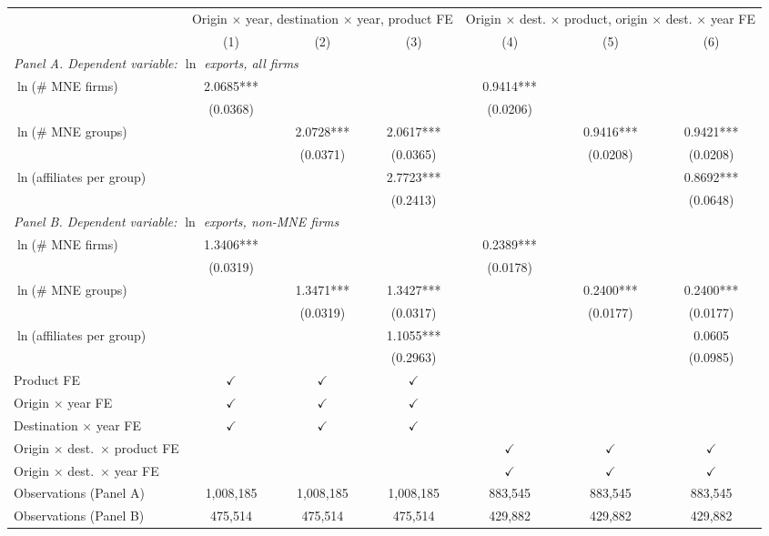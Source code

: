 \begin{tabular}{lcccccc} \hline
 & \multicolumn{3}{c}{Origin $\times$ year, destination $\times$ year, product FE} & \multicolumn{3}{c}{Origin $\times$ dest. $\times$ product, origin $\times$ dest. $\times$ year FE} \\
 & (1) & (2) & (3) & (4) & (5) & (6) \\ \hline
\multicolumn{7}{l}{\textit{Panel A. Dependent variable: $\ln$ exports, all firms}} \\
$\ln$(\# MNE firms) & 2.0685*** &  &  & 0.9414*** &  &  \\
 & (0.0368) &  &  & (0.0206) &  &  \\
$\ln$(\# MNE groups) &  & 2.0728*** & 2.0617*** &  & 0.9416*** & 0.9421*** \\
 &  & (0.0371) & (0.0365) &  & (0.0208) & (0.0208) \\
$\ln$(affiliates per group) &  &  & 2.7723*** &  &  & 0.8692*** \\
 &  &  & (0.2413) &  &  & (0.0648) \\
\midrule
\multicolumn{7}{l}{\textit{Panel B. Dependent variable: $\ln$ exports, non-MNE firms}} \\
$\ln$(\# MNE firms) & 1.3406*** &  &  & 0.2389*** &  &  \\
 & (0.0319) &  &  & (0.0178) &  &  \\
$\ln$(\# MNE groups) &  & 1.3471*** & 1.3427*** &  & 0.2400*** & 0.2400*** \\
 &  & (0.0319) & (0.0317) &  & (0.0177) & (0.0177) \\
$\ln$(affiliates per group) &  &  & 1.1055*** &  &  & 0.0605 \\
 &  &  & (0.2963) &  &  & (0.0985) \\
\hline
Product FE & $\checkmark$ & $\checkmark$ & $\checkmark$ &  &  &  \\
Origin $\times$ year FE & $\checkmark$ & $\checkmark$ & $\checkmark$ &  &  &  \\
Destination $\times$ year FE & $\checkmark$ & $\checkmark$ & $\checkmark$ &  &  &  \\
Origin $\times$ dest.\ $\times$ product FE &  &  &  & $\checkmark$ & $\checkmark$ & $\checkmark$ \\
Origin $\times$ dest.\ $\times$ year FE &  &  &  & $\checkmark$ & $\checkmark$ & $\checkmark$ \\
Observations (Panel A) & 1,008,185 & 1,008,185 & 1,008,185 & 883,545 & 883,545 & 883,545 \\
Observations (Panel B) & 475,514 & 475,514 & 475,514 & 429,882 & 429,882 & 429,882 \\
\hline
\end{tabular}
